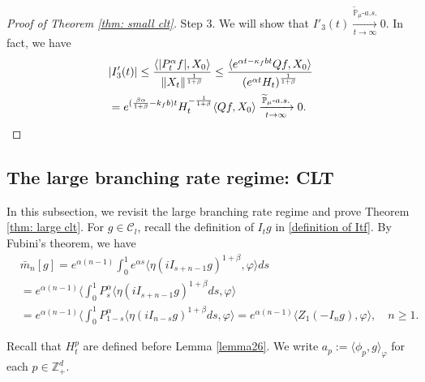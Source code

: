 \documentclass[12pt,a4paper]{amsart}
\theoremstyle{plain}
\theoremstyle{definition}
\numberwithin{equation}{section}
\begin{document}
\begin{proof}[Proof of Theorem \ref{thm: small clt}]
	Step 3. We will show that $I'_3(t) \xrightarrow[t\to \infty]{\widetilde {\mathbb P}_\mu \text{-} a.s.} 0$.
    In fact, we have
\begin{align}
	&|I'_3(t)|
     \leq \frac{\langle |P^\alpha_tf|,X_0\rangle}{\|X_t\|^{\frac{1}{1+\beta}}}
	\leq \frac{\langle e^{\alpha t - \kappa_f b t}Qf,X_0\rangle}{(e^{\alpha t} H_t)^{\frac{1}{1+\beta}}}
	\\& = e^{(\frac{\beta \alpha }{1+\beta} - k_fb)t} H_t^{-\frac{1}{1+\beta}} \langle Qf,X_0\rangle
	\xrightarrow[t\to \infty]{\widetilde {\mathbb P}_\mu \text{-} a.s.} 0.
    \qedhere
\end{align}
\end{proof}
\subsection{The large branching rate regime: CLT}
\label{sec: large rate clt}
    In this subsection, we revisit the large branching rate regime and prove Theorem \ref{thm: large clt}.
    For $g\in \mathcal{C}_l$, recall the definition of $I_tg$ in \eqref{definition of Itf}.
    By Fubini's theorem, we have
\begin{align}\label{equ: transform of mn}
    &\bar{m}_n[g]=e^{\alpha(n-1)}\int_0^1 e^{\alpha s}\langle \eta(iI_{s+n-1}g)^{1+\beta}, \varphi\rangle ds\\
    &=e^{\alpha(n-1)}\langle \int_0^1 P_s^{\alpha}\langle \eta(iI_{s+n-1}g)^{1+\beta}ds, \varphi\rangle\\
    &=e^{\alpha(n-1)}\langle \int_0^1 P_{1-s}^{\alpha}\langle \eta(iI_{n-s}g)^{1+\beta}ds, \varphi\rangle=e^{\alpha(n-1)}\langle Z_1(-I_ng),
    \varphi\rangle,
    \quad n\geq 1.
\end{align}

    Recall that $H^p_t$ are defined before Lemma \ref{lemma26}. We write $a_p:= \langle \phi_p, g\rangle_\varphi$ for each $p \in \mathbb Z_+^d$.
\end{document}
